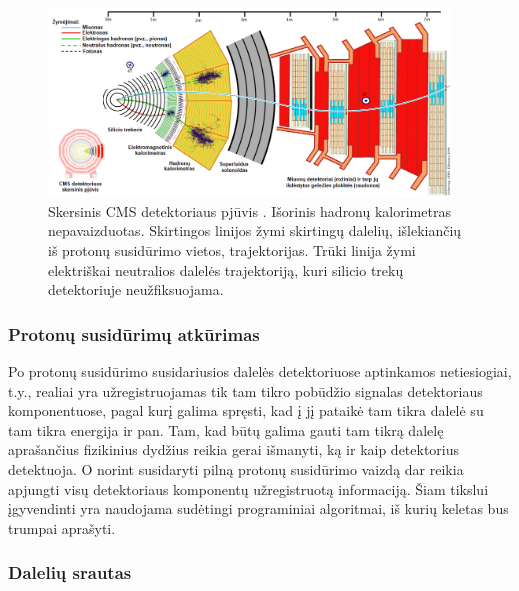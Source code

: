 \documentclass[a4paper, 12pt]{article}
\begin{document}
\begin{figure}[H] \centering
	\includegraphics[width=0.95\textwidth]{CMSslice_LT.png}
	\caption{\label{fig:CMSslice}Skersinis CMS detektoriaus pjūvis \cite{CMSslice}.
	Išorinis hadronų kalorimetras nepavaizduotas. Skirtingos linijos žymi skirtingų dalelių, išlekiančių
	iš protonų susidūrimo vietos, trajektorijas.
	Trūki linija žymi elektriškai neutralios dalelės trajektoriją, kuri silicio trekų detektoriuje
	neužfiksuojama.}
\end{figure}

\subsubsection{Protonų susidūrimų atkūrimas}\label{sec:ppReco}

Po protonų susidūrimo susidariusios dalelės detektoriuose aptinkamos netiesiogiai, t.y., realiai  yra
užregistruojamas tik tam tikro pobūdžio signalas detektoriaus komponentuose, pagal kurį galima spręsti,
kad į jį pataikė tam tikra dalelė su tam tikra energija ir pan.
Tam, kad būtų galima gauti tam tikrą dalelę aprašančius fizikinius dydžius reikia gerai išmanyti, ką
ir kaip detektorius detektuoja.
O norint susidaryti pilną protonų susidūrimo vaizdą dar reikia apjungti visų detektoriaus komponentų
užregistruotą informaciją.
Šiam tikslui įgyvendinti yra naudojama sudėtingi programiniai algoritmai, iš kurių keletas bus trumpai
aprašyti.


\subsubsection*{Dalelių srautas}
\end{document}
